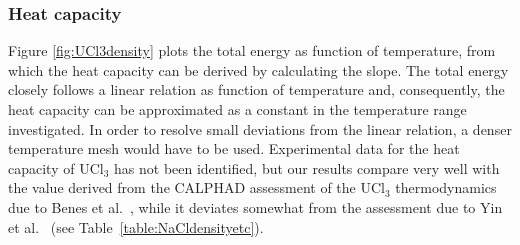 \documentclass[preprint,3p,10pt,onecolumn,number,sort&compress]{elsarticle}
\begin{document}
\subsubsection{Heat capacity} 
Figure \ref{fig:UCl3density} plots the total energy as function of temperature, from which the heat capacity can be derived by calculating the slope. The total energy closely follows a linear relation as function of temperature and, consequently, the heat capacity can be approximated as a constant in the temperature range investigated. In order to resolve small deviations from the linear relation, a denser temperature mesh would have to be used. 
Experimental data for the heat capacity of UCl$_3$ has not been identified, but our results compare very well with the value derived from the CALPHAD assessment of the UCl$_3$ thermodynamics due to Benes et al.~\cite{BENES2008}, while it deviates somewhat from the assessment due to Yin et al.~\cite{YIN2020} (see Table~\ref{table:NaCldensityetc}). %


\end{document}
